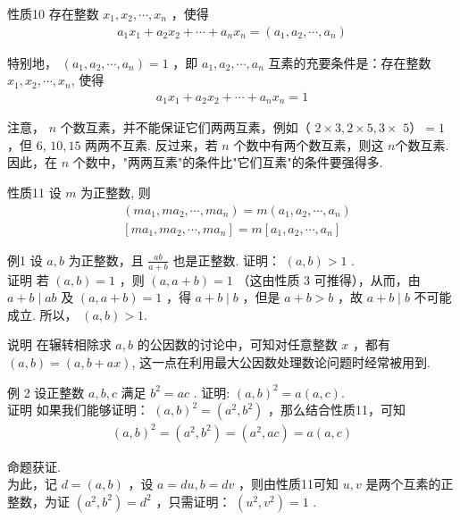 性质10 存在整数 $x_{1}, x_{2}, \cdots, x_{n}$ ，使得\\
\begin{align*}
a_{1} x_{1}+a_{2} x_{2}+\cdots+a_{n} x_{n}=\left(a_{1}, a_{2}, \cdots, a_{n}\right)
\end{align*}

特别地， $\left(a_{1}, a_{2}, \cdots, a_{n}\right)=1$ ，即 $a_{1}, a_{2}, \cdots, a_{n}$ 互素的充要条件是：存在整数 $x_{1}, x_{2}, \cdots, x_{n}$, 使得\\
\begin{align*}
a_{1} x_{1}+a_{2} x_{2}+\cdots+a_{n} x_{n}=1
\end{align*}

注意， $n$ 个数互素，并不能保证它们两两互素，例如（ $2 \times 3,2 \times 5,3 \times$ $5 ）=1$ ，但 6,  $10 ,  15$ 两两不互素. 反过来，若 $n$ 个数中有两个数互素，则这 $n$个数互素. 因此，在 $n$ 个数中，"两两互素"的条件比"它们互素"的条件要强得多. 

性质11 设 $m$ 为正整数, 则\\
\begin{align}
& \left(m a_{1}, m a_{2}, \cdots, m a_{n}\right)=m\left(a_{1}, a_{2}, \cdots, a_{n}\right) \\
& {\left[m a_{1}, m a_{2}, \cdots, m a_{n}\right]=m\left[a_{1}, a_{2}, \cdots, a_{n}\right]}
\end{align}

例1 设 $a ,  b$ 为正整数，且 $\frac{a b}{a+b}$ 也是正整数. 证明： $(a, b)>1$ . \\
证明 若 $(a, b)=1$ ，则 $(a, a+b)=1$ （这由性质 3 可推得），从而，由 $a+b \mid a b$ 及 $(a, a+b)=1$ ，得 $a+b \mid b$ ，但是 $a+b>b$ ，故 $a+b \mid b$ 不可能成立. 所以， $(a, b)>1$.

说明 在辗转相除求 $a ,  b$ 的公因数的讨论中，可知对任意整数 $x$ ，都有 $(a, b)=(a, b+a x)$, 这一点在利用最大公因数处理数论问题时经常被用到. 

例 2 设正整数 $a ,  b ,  c$ 满足 $b^{2}=a c$ . 证明: $(a, b)^{2}=a(a, c)$.\\
证明 如果我们能够证明： $(a, b)^{2}=\left(a^{2}, b^{2}\right)$ ，那么结合性质11，可知\\
\begin{align*}
(a, b)^{2}=\left(a^{2}, b^{2}\right)=\left(a^{2}, a c\right)=a(a, c)
\end{align*}

命题获证.\\
为此，记 $d=(a, b)$ ，设 $a=d u, b=d v$ ，则由性质11可知 $u ,  v$ 是两个互素的正整数，为证 $\left(a^{2}, b^{2}\right)=d^{2}$ ，只需证明： $\left(u^{2}, v^{2}\right)=1$ . 

